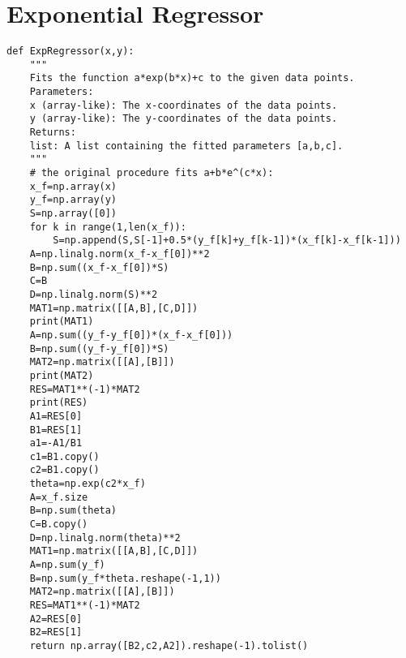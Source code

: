\section{Exponential Regressor}
\label{sec:expreg}
\begin{verbatim}
def ExpRegressor(x,y):
    """
    Fits the function a*exp(b*x)+c to the given data points.
    Parameters:
    x (array-like): The x-coordinates of the data points.
    y (array-like): The y-coordinates of the data points.
    Returns:
    list: A list containing the fitted parameters [a,b,c].
    """
    # the original procedure fits a+b*e^(c*x): 
    x_f=np.array(x)
    y_f=np.array(y)
    S=np.array([0])
    for k in range(1,len(x_f)):
        S=np.append(S,S[-1]+0.5*(y_f[k]+y_f[k-1])*(x_f[k]-x_f[k-1]))
    A=np.linalg.norm(x_f-x_f[0])**2
    B=np.sum((x_f-x_f[0])*S)
    C=B
    D=np.linalg.norm(S)**2
    MAT1=np.matrix([[A,B],[C,D]])
    print(MAT1)
    A=np.sum((y_f-y_f[0])*(x_f-x_f[0]))
    B=np.sum((y_f-y_f[0])*S)
    MAT2=np.matrix([[A],[B]])
    print(MAT2)
    RES=MAT1**(-1)*MAT2
    print(RES)
    A1=RES[0]
    B1=RES[1]
    a1=-A1/B1
    c1=B1.copy()
    c2=B1.copy()
    theta=np.exp(c2*x_f)
    A=x_f.size
    B=np.sum(theta)
    C=B.copy()
    D=np.linalg.norm(theta)**2
    MAT1=np.matrix([[A,B],[C,D]])
    A=np.sum(y_f)
    B=np.sum(y_f*theta.reshape(-1,1))
    MAT2=np.matrix([[A],[B]])
    RES=MAT1**(-1)*MAT2
    A2=RES[0]
    B2=RES[1]
    return np.array([B2,c2,A2]).reshape(-1).tolist()
\end{verbatim}

